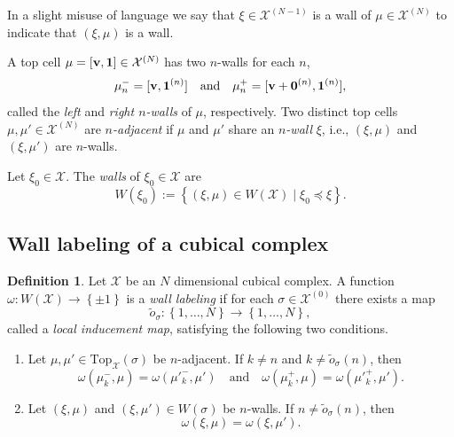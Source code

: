 \documentclass[12pt, notitlepage]{amsart}
\newcommand{\setof}[1]{\left\{ {#1}\right\}}
\newcommand{\bv}{{\bf v}}
\newcommand{\cX}{{\mathcal X}}
\newcommand{\Top}{{\mathrm{Top}}}
\theoremstyle{definition}
\newtheorem{defn}[thm]{Definition}
\begin{document}
  In a slight misuse of language we say that $\xi\in\cX^{(N-1)}$ is a wall of $\mu\in\cX^{(N)}$ to indicate that $(\xi, \mu)$ is a wall.

  A top cell $\mu = [\bv, {\bf 1}] \in \cX^{(N)}$ has two $n$-walls
  for each $n$,
  \[
    \mu^-_n = [\bv, {\bf 1}^{(n)}]\quad \text{and}\quad \mu^+_n = [\bv + {\bf 0}^{(n)}, {\bf 1}^{(n)}],
  \]
  called the \emph{left} and \emph{right $n$-walls} of $\mu$, respectively.
  Two distinct top cells $\mu,\mu'\in\cX^{(N)}$ are \emph{$n$-adjacent} if $\mu$ and $\mu'$ share an \emph{$n$-wall} $\xi$, i.e., $(\xi, \mu)$ and $(\xi, \mu')$ are $n$-walls.

  Let $\xi_0 \in\cX$.
  The \emph{walls} of $\xi_0\in\cX$ are
  \begin{equation*}
    W(\xi_0) := \setof{(\xi, \mu) \in W(\cX) \mid  \xi_0 \preceq \xi}.
  \end{equation*}

  \subsection{Wall labeling of a cubical complex}
  \label{DSGRN_wall_labeling}

  \begin{defn}
    \label{def:wall_labeling}
    Let $\cX$ be an $N$ dimensional cubical complex.
    A function $\omega \colon W(\cX) \to \setof{\pm 1}$ is a \emph{wall labeling} if for each $\sigma \in \cX^{(0)}$ there exists a map
    \[
      \tilde{o}_{\sigma}\colon \setof{1, \ldots, N} \to \setof{1,\ldots, N},
    \]
    called a \emph{local inducement map}, satisfying the following two conditions.
    \begin{enumerate}
      \item[(i)] Let $\mu, \mu'\in \Top_\cX(\sigma)$ be $n$-adjacent.
        If $k \neq n$ and $k \neq \tilde{o}_\sigma(n)$, then
        \[
          \omega(\mu^-_k, \mu) = \omega(\mu'^-_k, \mu') \quad \text{and} \quad \omega(\mu^+_k, \mu) = \omega(\mu'^+_k, \mu').
        \]
      \item[(ii)] Let $(\xi, \mu)$ and $(\xi, \mu') \in W(\sigma)$ be $n$-walls. If $n \neq \tilde{o}_\sigma(n)$, then
        \[
          \omega(\xi, \mu) = \omega(\xi, \mu').
        \]
    \end{enumerate}
  \end{defn}

\end{document}
